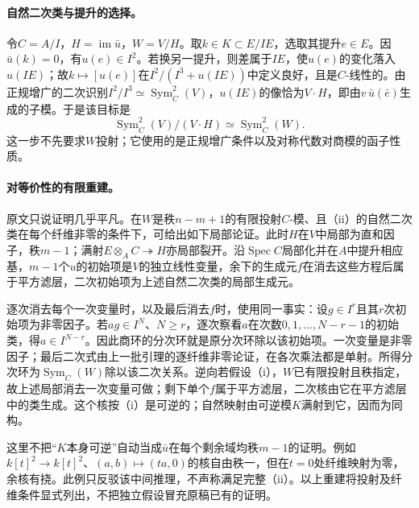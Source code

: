 \documentclass[openany,fontset=fandol]{ctexbook}
\newcommand{\Sym}{\operatorname{Sym}}
\newcommand{\im}{\operatorname{im}}
\begin{document}
\paragraph{自然二次类与提升的选择。}
令$C=A/I$，$H=\im\bar u$，$W=V/H$。取$k\in K\subset E/IE$，选取其提升$e\in E$。因$\bar u(k)=0$，有$u(e)\in I^2$。若换另一提升，则差属于$IE$，使$u(e)$的变化落入$u(IE)$；故$k\mapsto[u(e)]$在$I^2/(I^3+u(IE))$中定义良好，且是$C$-线性的。由正规增广的二次识别$I^2/I^3\simeq\Sym_C^2(V)$，$u(IE)$的像恰为$V\cdot H$，即由$v\,\bar u(\bar e)$生成的子模。于是该目标是
\[
\Sym_C^2(V)/(V\cdot H)\simeq\Sym_C^2(W).
\]
这一步不先要求$W$投射；它使用的是正规增广条件以及对称代数对商模的函子性质。

\paragraph{对等价性的有限重建。}
原文只说证明几乎平凡。在$W$是秩$n-m+1$的有限投射$C$-模、且（ii）的自然二次类在每个纤维非零的条件下，可给出如下局部论证。此时$H$在$V$中局部为直和因子，秩$m-1$；满射$E\otimes_A C\twoheadrightarrow H$亦局部裂开。沿$\operatorname{Spec}C$局部化并在$A$中提升相应基，$m-1$个$u$的初始项是$V$的独立线性变量，余下的生成元$f$在消去这些方程后属于平方滤层，二次初始项为上述自然二次类的局部生成元。

逐次消去每个一次变量时，以及最后消去$f$时，使用同一事实：设$g\in I^r$且其$r$次初始项为非零因子。若$ag\in I^N$、$N\ge r$，逐次察看$a$在次数$0,1,\dots,N-r-1$的初始类，得$a\in I^{N-r}$。因此商环的分次环就是原分次环除以该初始项。一次变量是非零因子；最后二次式由上一批引理的逐纤维非零论证，在各次乘法都是单射。所得分次环为$\Sym_C(W)$除以该二次关系。逆向若假设（i），$W$已有限投射且秩指定，故上述局部消去一次变量可做；剩下单个$f$属于平方滤层，二次核由它在平方滤层中的类生成。这个核按（i）是可逆的；自然映射由可逆模$K$满射到它，因而为同构。

这里不把“$K$本身可逆”自动当成$\bar u$在每个剩余域均秩$m-1$的证明。例如$k[t]^2\to k[t]^2$、$(a,b)\mapsto(ta,0)$的核自由秩一，但在$t=0$处纤维映射为零，余核有挠。此例只反驳该中间推理，不声称满足完整（ii）。以上重建将投射及纤维条件显式列出，不把独立假设冒充原稿已有的证明。
\end{document}
